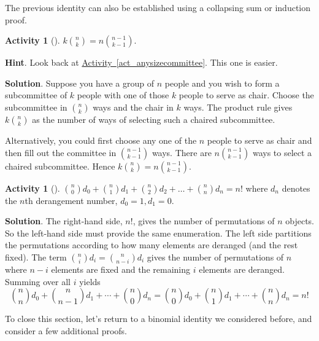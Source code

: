 \documentclass[10pt,]{book}
\theoremstyle{plain}
\theoremstyle{definition}
\theoremstyle{definition}
\theoremstyle{definition}
\newtheorem{activity}[project]{Activity}
\numberwithin{equation}{chapter}
\begin{document}
\hypertarget{p-729}{}%
The previous identity can also be established using a collapsing sum or induction proof.%
\begin{activity}[]\label{activity-99}
\hypertarget{p-730}{}%
\(k \binom{n}{k} = n \binom{n - 1}{k - 1}\).%
\par\smallskip%
\noindent\textbf{Hint}.\hypertarget{hint-60}{}\quad%
\hypertarget{p-731}{}%
Look back at \hyperref[act_anysizecommittee]{Activity~\ref{act_anysizecommittee}}.  This one is easier.%
\par\smallskip%
\noindent\textbf{Solution}.\hypertarget{solution-54}{}\quad%
\hypertarget{p-732}{}%
Suppose you have a group of \(n\) people and you wish to form a subcommittee of \(k\) people with one of those \(k\) people to serve as chair. Choose the subcommittee in \(\binom{n}{k}\) ways and the chair in \(k\) ways. The product rule gives \(k \binom{n}{k}\) as the number of ways of selecting such a chaired subcommittee.%
\par
\hypertarget{p-733}{}%
Alternatively, you could first choose any one of the \(n\) people to serve as chair and then fill out the committee in \(\binom{n - 1}{k - 1}\) ways. There are \(n \binom{n - 1}{k - 1}\) ways to select a chaired subcommittee. Hence \(k \binom{n}{k} = n \binom{n - 1}{k - 1}\).%
\end{activity}
\begin{activity}[]\label{activity-100}
\hypertarget{p-734}{}%
\(\binom{n}{0} d_{0} + \binom{n}{1} d_{1} + \binom{n}{2} d_{2} + \ldots + \binom{n}{n} d_{n} = n!\) where \(d_{n}\) denotes the \(n\)th derangement number, \(d_{0} = 1,d_{1} = 0\).%
\par\smallskip%
\noindent\textbf{Solution}.\hypertarget{solution-55}{}\quad%
\hypertarget{p-735}{}%
The right-hand side, \(n!\), gives the number of permutations of \(n\) objects. So the left-hand side must provide the same enumeration. The left side partitions the permutations according to how many elements are deranged (and the rest fixed). The term \(\binom{n}{i} d_{i} = \binom{n}{n - i} d_{i}\) gives the number of permutations of \(n\) where \(n - i\) elements are fixed and the remaining \(i\) elements are deranged. Summing over all \(i\) yields%
\begin{equation*}
\binom{n}{n} d_{0} + \binom{n}{n - 1} d_{1} + \cdots + \binom{n}{0} d_{n} = \binom{n}{0} d_{0} + \binom{n}{1} d_{1} + \cdots + \binom{n}{n} d_{n} = n!
\end{equation*}
%
\end{activity}
\hypertarget{p-736}{}%
To close this section, let's return to a binomial identity we considered before, and consider a few additional proofs.%
\end{document}
